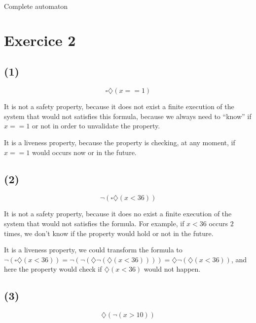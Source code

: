 \documentclass[a4paper,11pt]{report}
\newcommand*{\A}{\square}  %
\newcommand*{\D}{\diamondsuit} %
\begin{document}
Complete automaton
\begin{center}
\end{center}

\section*{Exercice 2}

\subsection*{(1)}
\[
  \A \D (x == 1)
\]

It is not a safety property, because it does not exist a finite execution of the
system that would not satisfies this formula, because we always need to ``know''
if $x==1$ or not in order to unvalidate the property.

It is a liveness property, because the property is checking, at any moment, if
$x==1$ would occurs now or in the future.

\subsection*{(2)}
\[
  \neg (\A \D (x < 36))
\]

It is not a safety property, because it does no exist a finite execution of the
system that would not satisfies the formula. For example, if $x < 36$ occurs $2$
times, we don't know if the property would hold or not in the future.

It is a liveness property, we could transform the formula to $\neg (\A \D (x <
36)) = \neg (\neg (\D \neg (\D (x < 36)))) = \D \neg (\D (x < 36))$, and here
the property would check if $\D (x < 36)$ would not happen.

\subsection*{(3)}
\[
  \D (\neg (x > 10))
\]
\end{document}
